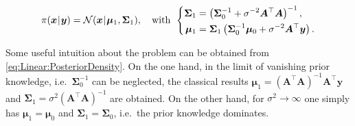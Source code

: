 \begin{equation} \label{eq:Linear:PosteriorDensity}
  \pi(\bm{x} {\:\!}|{\:\!} \bm{y}) = \mathcal{N}(\bm{x} {\:\!}|{\:\!} \bm{\mu}_1, \bm{\Sigma}_1), \quad \text{with} \;\,
  \left\{
  \begin{aligned}
    \bm{\Sigma}_1 &= \left( \bm{\Sigma}_0^{-1} + \sigma^{-2} \bm{A}^\top \bm{A} \right)^{-1}, \\
    \bm{\mu}_1 &= \bm{\Sigma}_1 \left( \bm{\Sigma}_0^{-1} \bm{\mu}_0 + \sigma^{-2} \bm{A}^\top \bm{y} \right).
  \end{aligned}
  \right.
\end{equation}
\par %
Some useful intuition about the problem can be obtained from \cref{eq:Linear:PosteriorDensity}.
On the one hand, in the limit of vanishing prior knowledge, i.e.\ \(\bm{\Sigma}_0^{-1}\) can be neglected,
the classical results \(\bm{\mu}_1 = (\bm{A}^\top \bm{A})^{-1} \bm{A}^\top \bm{y}\) and \(\bm{\Sigma}_1 = \sigma^2 (\bm{A}^\top \bm{A})^{-1}\) are obtained.
On the other hand, for \(\sigma^2 \rightarrow \infty\) one simply has \(\bm{\mu}_1 = \bm{\mu}_0\) and \(\bm{\Sigma}_1 = \bm{\Sigma}_0\), i.e.\ the prior knowledge dominates.


